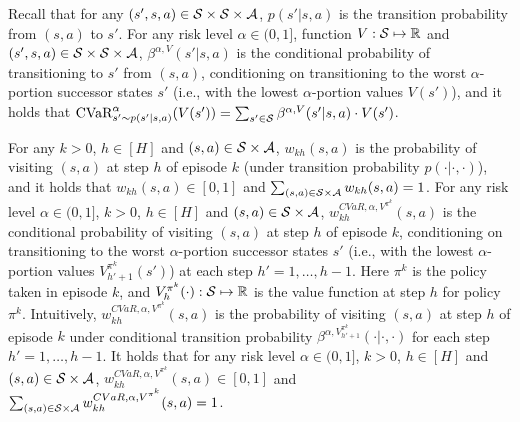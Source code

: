 Recall that for any $(s',s,a) \in \mathcal{S} \times \mathcal{S} \times \mathcal{A}$, $p(s'|s,a)$ is the transition probability from $(s,a)$ to $s'$. 
For any risk level $\alpha \in (0,1]$, function $V: \mathcal{S} \mapsto \mathbb{R}$ and $(s',s,a) \in \mathcal{S} \times \mathcal{S} \times \mathcal{A}$, $\beta^{\alpha,V}(s'|s,a)$ is the conditional probability of transitioning to $s'$ from $(s,a)$, conditioning on transitioning to the worst $\alpha$-portion successor states $s'$ (i.e., with the lowest $\alpha$-portion values $V(s')$), and it holds that $\textup{CVaR}^{\alpha}_{s'\sim p(s'|s,a)}(V(s'))=\sum_{s' \in \mathcal{S}} \beta^{\alpha,V}(s'|s,a) \cdot V(s')$. 


For any $k>0$, $h \in [H]$ and $(s,a) \in \mathcal{S} \times \mathcal{A}$, $w_{kh}(s,a)$ is the probability of visiting $(s,a)$ at step $h$ of episode $k$ (under transition probability $p(\cdot|\cdot,\cdot)$), and it holds that $w_{kh}(s,a) \in  [0,1]$ and $\sum_{(s,a)\in \mathcal{S} \times \mathcal{A}} w_{kh}(s,a)=1$.
For any risk level $\alpha \in (0,1]$, $k>0$, $h \in [H]$ and $(s,a) \in \mathcal{S} \times \mathcal{A}$, $w_{kh}^{CVaR,\alpha,V^{\pi^k}}(s,a)$ is the conditional probability of visiting $(s,a)$ at step $h$ of episode $k$, conditioning on transitioning to the worst $\alpha$-portion successor states $s'$ (i.e., with the lowest $\alpha$-portion values $V_{h'+1}^{\pi^k}(s')$) at each step $h'=1,\dots,h-1$. Here $\pi^k$ is the policy taken in episode $k$, and $V_{h}^{\pi^k}(\cdot):\mathcal{S} \mapsto \mathbb{R}$ is the value function at step $h$ for policy $\pi^k$.
Intuitively,  $w_{kh}^{CVaR,\alpha,V^{\pi^k}}(s,a)$ is the probability of visiting $(s,a)$ at step $h$ of episode $k$ under conditional transition probability $\beta^{\alpha,V_{h'+1}^{\pi^k}}(\cdot|\cdot,\cdot)$ for each step $h'=1,\dots,h-1$. It holds that for any risk level $\alpha \in (0,1]$, $k>0$, $h \in [H]$ and $(s,a) \in \mathcal{S} \times \mathcal{A}$, $w_{kh}^{CVaR,\alpha,V^{\pi^k}}(s,a) \in [0,1]$ and $\sum_{(s,a) \in \mathcal{S} \times \mathcal{A}} w_{kh}^{CVaR,\alpha,V^{\pi^k}}(s,a)=1$.

